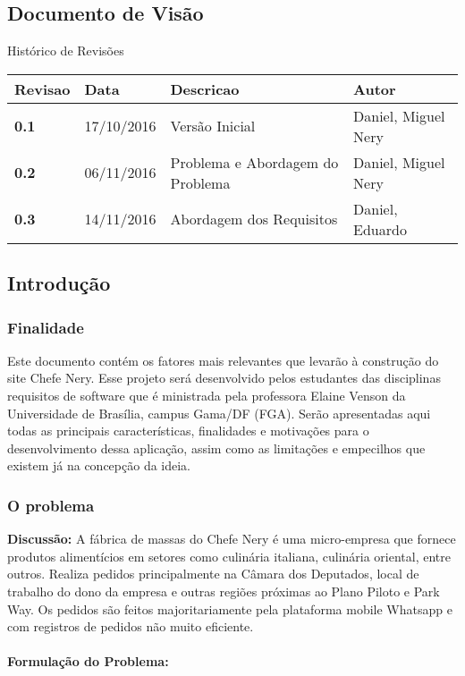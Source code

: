 \begin{apendicesenv}

\partapendices

\chapter{Documento de Visão}

\tab Histórico de Revisões\\


\begin{tabular}{|l|l|l|l|}
  \hline
  \textbf{Revisao} & Data &  Descricao &  Autor \\ \hline
  \textbf{0.1} &  17/10/2016 &  Versão Inicial &  Daniel, Miguel Nery \\ \hline
  \textbf{0.2} &  06/11/2016 &  Problema e Abordagem do Problema &  Daniel, Miguel Nery \\ \hline
  \textbf{0.3} &  14/11/2016 &  Abordagem dos Requisitos & Daniel, Eduardo \\ \hline
\end{tabular}

{\large {\section { Introdução \\ } } }

{\subsection {Finalidade\\ }}
\tab Este documento contém os fatores mais relevantes que levarão à construção do site Chefe Nery. Esse projeto será desenvolvido pelos estudantes das disciplinas requisitos de software que é ministrada pela professora Elaine Venson da Universidade de Brasília, campus Gama/DF (FGA). Serão apresentadas aqui todas as principais características, finalidades e motivações para o desenvolvimento dessa aplicação, assim como as limitações e empecilhos que existem já na concepção da ideia.
\\

{\subsection {O problema\\ }}
\textbf{Discussão:} A fábrica de massas do Chefe Nery é uma micro-empresa que fornece produtos alimentícios em setores como culinária italiana, culinária oriental, entre outros. Realiza pedidos principalmente na Câmara dos Deputados, local de trabalho do dono da empresa e outras regiões próximas ao Plano Piloto e Park Way. Os pedidos são feitos majoritariamente pela plataforma mobile Whatsapp e com registros de pedidos não muito eficiente. \\
\tab \\
\textbf{Formulação do Problema:}



\end{apendicesenv}
